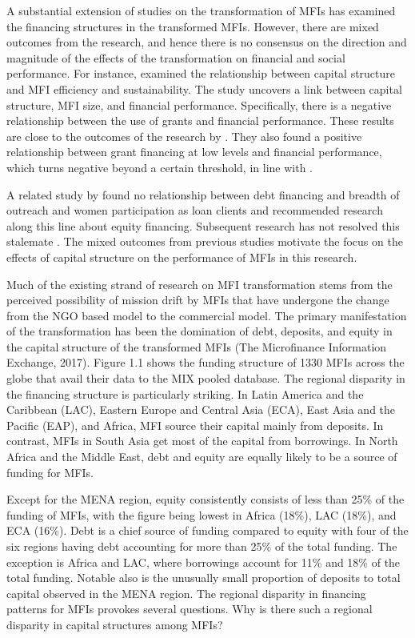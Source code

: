 \documentclass[a4paper, nobind]{templates/ociamthesis}
\begin{document}
A substantial extension of studies on the transformation of MFIs has examined the financing structures in the transformed MFIs. However, there are mixed outcomes from the research, and hence there is no consensus on the direction and magnitude of the effects of the transformation on financial and social performance. For instance, \autocite{bogan2012capital} examined the relationship between capital structure and MFI efficiency and sustainability. The study uncovers a link between capital structure, MFI size, and financial performance. Specifically, there is a negative relationship between the use of grants and financial performance. These results are close to the outcomes of the research by \autocite{hudon2011efficiency}. They also found a positive relationship between grant financing at low levels and financial performance, which turns negative beyond a certain threshold, in line with \autocite{d2017ngos}.

A related study by \textcite{kar2012does} found no relationship between debt financing and breadth of outreach and women participation as loan clients and recommended research along this line about equity financing. Subsequent research has not resolved this stalemate \autocite{hoque2011commercialization,kyereboah2007determinants,khachatryan2017performance,d2017ngos}. The mixed outcomes from previous studies motivate the focus on the effects of capital structure on the performance of MFIs in this research.

Much of the existing strand of research on MFI transformation stems from the perceived possibility of mission drift by MFIs that have undergone the change from the NGO based model to the commercial model. The primary manifestation of the transformation has been the domination of debt, deposits, and equity in the capital structure of the transformed MFIs (The Microfinance Information Exchange, 2017). Figure 1.1 shows the funding structure of 1330 MFIs across the globe that avail their data to the MIX pooled database. The regional disparity in the financing structure is particularly striking. In Latin America and the Caribbean (LAC), Eastern Europe and Central Asia (ECA), East Asia and the Pacific (EAP), and Africa, MFI source their capital mainly from deposits. In contrast, MFIs in South Asia get most of the capital from borrowings. In North Africa and the Middle East, debt and equity are equally likely to be a source of funding for MFIs.

Except for the MENA region, equity consistently consists of less than 25\% of the funding of MFIs, with the figure being lowest in Africa (18\%), LAC (18\%), and ECA (16\%). Debt is a chief source of funding compared to equity with four of the six regions having debt accounting for more than 25\% of the total funding. The exception is Africa and LAC, where borrowings account for 11\% and 18\% of the total funding. Notable also is the unusually small proportion of deposits to total capital observed in the MENA region. The regional disparity in financing patterns for MFIs provokes several questions. Why is there such a regional disparity in capital structures among MFIs?
\end{document}
